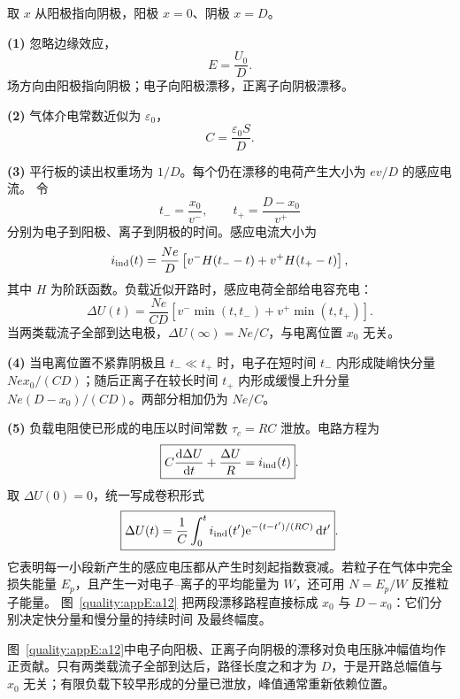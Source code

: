 \begin{xesolution}
取 $x$ 从阳极指向阴极，阳极 $x=0$、阴极 $x=D$。

\textbf{(1)} 忽略边缘效应，
\begin{equation}
  \boxed{E=\frac{U_0}{D}}.
\end{equation}
场方向由阳极指向阴极；电子向阳极漂移，正离子向阴极漂移。

\textbf{(2)} 气体介电常数近似为 $\varepsilon_0$，
\begin{equation}
  \boxed{C=\frac{\varepsilon_0S}{D}}.
\end{equation}

\textbf{(3)} 平行板的读出权重场为 $1/D$。每个仍在漂移的电荷产生大小为 $ev/D$ 的感应电流。
令
\[
  t_- =\frac{x_0}{v^-},
  \qquad
  t_+ =\frac{D-x_0}{v^+}
\]
分别为电子到阳极、离子到阴极的时间。感应电流大小为
\begin{equation}
  i_{\rm ind}(t)=\frac{Ne}{D}
  \left[v^-H(t_--t)+v^+H(t_+-t)\right],
\end{equation}
其中 $H$ 为阶跃函数。负载近似开路时，感应电荷全部给电容充电：
\begin{equation}
  \boxed{\Delta U(t)=\frac{Ne}{CD}\left[
  v^-\min(t,t_-)+v^+\min(t,t_+)\right]}.
\end{equation}
当两类载流子全部到达电极，$\Delta U(\infty)=Ne/C$，与电离位置 $x_0$ 无关。

\textbf{(4)} 当电离位置不紧靠阴极且 $t_-\ll t_+$ 时，电子在短时间 $t_-$ 内形成陡峭快分量
$Ne x_0/(CD)$；随后正离子在较长时间 $t_+$ 内形成缓慢上升分量
$Ne(D-x_0)/(CD)$。两部分相加仍为 $Ne/C$。

\textbf{(5)} 负载电阻使已形成的电压以时间常数 $\tau_c=RC$ 泄放。电路方程为
\begin{equation}
  \boxed{C\frac{\mathop{}\!\mathrm d\Delta U}{\mathop{}\!\mathrm d t}+\frac{\Delta U}{R}=i_{\rm ind}(t)}.
\end{equation}
取 $\Delta U(0)=0$，统一写成卷积形式
\begin{equation}
  \boxed{\Delta U(t)=\frac1C\int_0^t
  i_{\rm ind}(t')\mathrm e^{-(t-t')/(RC)}\mathop{}\!\mathrm d t'}.
\end{equation}
它表明每一小段新产生的感应电压都从产生时刻起指数衰减。若粒子在气体中完全损失能量
$E_p$，且产生一对电子--离子的平均能量为 $W$，还可用 $N=E_p/W$ 反推粒子能量。
图~\ref{quality:appE:a12} 把两段漂移路程直接标成 $x_0$ 与 $D-x_0$：它们分别决定快分量和慢分量的持续时间
及最终幅度。


图~\ref{quality:appE:a12}中电子向阳极、正离子向阴极的漂移对负电压脉冲幅值均作正贡献。只有两类载流子全部到达后，路径长度之和才为 $D$，于是开路总幅值与 $x_0$ 无关；有限负载下较早形成的分量已泄放，峰值通常重新依赖位置。
\end{xesolution}

